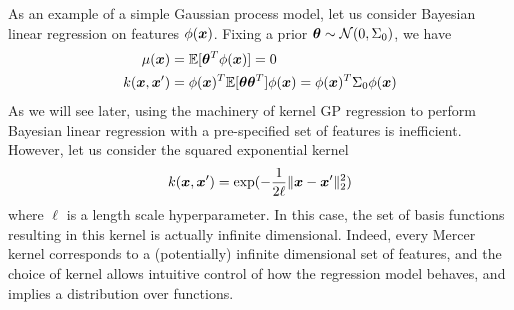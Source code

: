 As an example of a simple Gaussian process model, let us consider Bayesian linear regression on features $\phi(\bm{x})$. Fixing a prior $\bm{\theta} \sim \mathcal{N}(0, \Sigma_0)$, we have 
\begin{align}
    \mu(\bm{x}) &= \mathbb{E}[\bm{\theta}^T \phi(\bm{x})] = 0\\
    k(\bm{x}, \bm{x}') &= \phi(\bm{x})^T \mathbb{E}[\bm{\theta} \bm{\theta}^T] \phi(\bm{x}) = \phi(\bm{x})^T \Sigma_0 \phi(\bm{x})
\end{align}
As we will see later, using the machinery of kernel GP regression to perform Bayesian linear regression with a pre-specified set of features is inefficient. However, let us consider the squared exponential kernel
\begin{equation}
    k(\bm{x},\bm{x}') = \exp(-\frac{1}{2 \ell}\|\bm{x} - \bm{x}'\|^2_2)
\end{equation}
where $\ell$ is a length scale hyperparameter. In this case, the set of basis functions resulting in this kernel is actually infinite dimensional. Indeed, every Mercer kernel corresponds to a (potentially) infinite dimensional set of features, and the choice of kernel allows intuitive control of how the regression model behaves, and implies a distribution over functions. 

